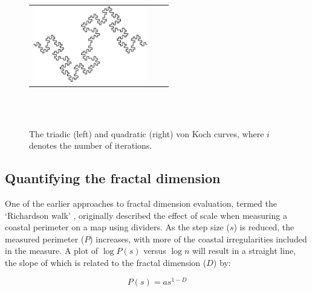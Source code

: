 \begin{figure}[htbp]
{\begin{tabular}{m{5cm} c m{5cm}}
			\includegraphics[width=5cm]{../C6/qKochn3}
		\end{tabular}
	} \\
	 \\
	\caption{The triadic (left) and quadratic (right) von Koch curves, where $i$ denotes the number of iterations.}
	\label{fig:KochCurve}
\end{figure}

\subsection{Quantifying the fractal dimension}

One of the earlier approaches to fractal dimension evaluation, termed the \lq Richardson walk' \cite{richardson1961}, originally described the effect of scale when measuring a coastal perimeter on a map using dividers. As the step size ($s$) is reduced, the measured perimeter ($P$) increases, with more of the coastal irregularities included in the measure. A plot of $\log P(s)$ versus $\log n$ will result in a straight line, the slope of which is related to the fractal dimension ($D$) by:

\begin{equation}
	P(s) = a s^{1-D}
\end{equation}

